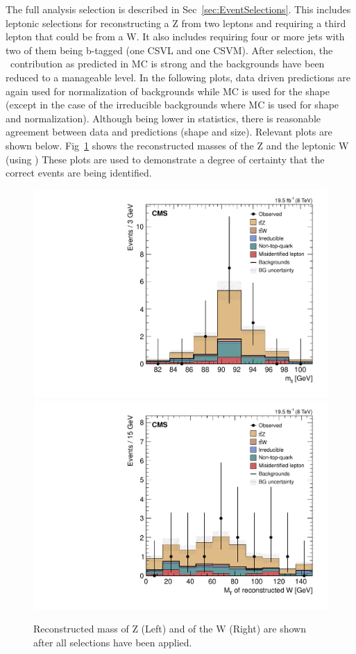	The full analysis selection is described in Sec~\ref{sec:EventSelections}. This includes leptonic selections for reconstructing a Z from two leptons and requiring a third lepton that could be from a W. It also includes requiring four or more jets with two of them being b-tagged (one CSVL and one CSVM). After selection, the \ttZ \ contribution as predicted in MC is strong and the backgrounds have been reduced to a manageable level. In the following plots, data driven predictions are again used for normalization of backgrounds while MC is used for the shape (except in the case of the irreducible backgrounds where MC is used for shape and normalization). Although being lower in statistics, there is reasonable agreement between data and predictions (shape and size). Relevant plots are shown below. Fig~\ref{fig:hmass_3l2j2b} shows the reconstructed masses of the Z and the leptonic W (using \Mt) %
These plots are used to demonstrate a degree of certainty that the correct events are being identified. %

\begin{figure}[h]
\begin{center}
\includegraphics[width=0.48\linewidth]{Figs/Plots_Final_Selections/hZMass_3L2J2b.pdf}
\includegraphics[width=0.48\linewidth]{Figs/Plots_Final_Selections/hWMt_3L2J2b.pdf}
\caption{\label{fig:hmass_3l2j2b}
Reconstructed mass of Z (Left) and \Mt of the W (Right) are shown after all selections have been applied.
}
\end{center}
\end{figure}


